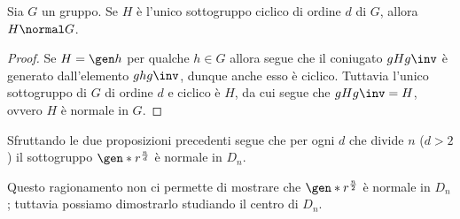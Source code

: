 \begin{corollary}
    Sia $G$ un gruppo. Se $H$ è l'unico sottogruppo ciclico di ordine $d$ di $G$, allora $H \normal G$.
\end{corollary}
\begin{proof}
    Se $H = \gen h$ per qualche $h \in G$ allora segue che il coniugato $gHg\inv$ è generato dall'elemento $ghg\inv$, dunque anche esso è ciclico. Tuttavia l'unico sottogruppo di $G$ di ordine $d$ e ciclico è $H$, da cui segue che $gHg\inv = H$, ovvero $H$ è normale in $G$.
\end{proof}

Sfruttando le due proposizioni precedenti segue che per ogni $d$ che divide $n$ ($d > 2$) il sottogruppo $\gen*{r^{\frac{n}{d}}}$ è normale in $D_n$.

Questo ragionamento non ci permette di mostrare che $\gen*{r^{\frac{n}2}}$ è normale in $D_n$; tuttavia possiamo dimostrarlo studiando il centro di $D_n$.

